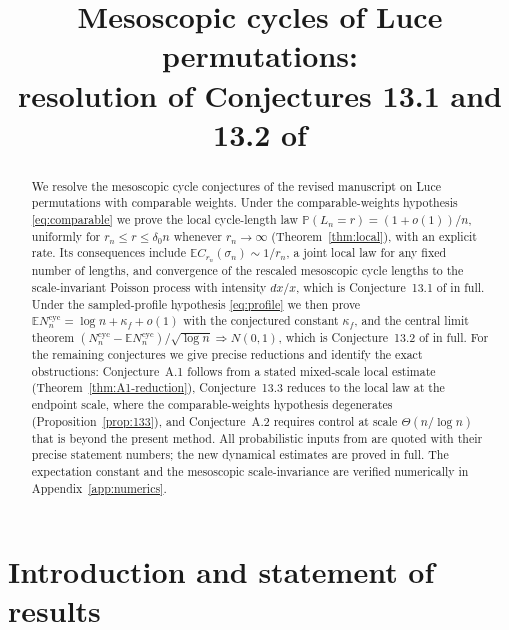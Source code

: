 \documentclass[11pt]{article}
\title{Mesoscopic cycles of Luce permutations:\\
resolution of Conjectures 13.1 and 13.2 of \cite{Lon26}}
\author{}
\date{}
\newcommand{\E}{\mathbb{E}}
\newcommand{\Prob}{\mathbb{P}}
\newcommand{\1}{\mathbf{1}}
\newcommand{\cyc}{\mathrm{cyc}}
\theoremstyle{remark}
\begin{document}
\maketitle

\begin{abstract}
We resolve the mesoscopic cycle conjectures of the revised manuscript
\cite{Lon26} on Luce permutations with comparable weights. Under the
comparable-weights hypothesis \eqref{eq:comparable} we prove the local
cycle-length law $\Prob(L_n=r)=(1+o(1))/n$, uniformly for
$r_n\le r\le\delta_0 n$ whenever $r_n\to\infty$ (Theorem~\ref{thm:local}),
with an explicit rate. Its consequences include
$\E C_{r_n}(\sigma_n)\sim 1/r_n$, a joint local law for any fixed
number of lengths, and convergence of the rescaled mesoscopic cycle
lengths to the scale-invariant Poisson process with intensity $dx/x$,
which is Conjecture~13.1 of \cite{Lon26} in full. Under the
sampled-profile hypothesis \eqref{eq:profile} we then prove
$\E N_n^{\cyc}=\log n+\kappa_f+o(1)$ with the conjectured constant
$\kappa_f$, and the central limit theorem
$(N_n^{\cyc}-\E N_n^{\cyc})/\sqrt{\log n}\Rightarrow N(0,1)$, which is
Conjecture~13.2 of \cite{Lon26} in full. For the remaining
conjectures we give precise reductions and identify the exact
obstructions: Conjecture~A.1 follows from a stated mixed-scale local
estimate (Theorem~\ref{thm:A1-reduction}), Conjecture~13.3 reduces to
the local law at the endpoint scale, where the comparable-weights
hypothesis degenerates (Proposition~\ref{prop:133}), and
Conjecture~A.2 requires control at scale $\Theta(n/\log n)$ that is
beyond the present method. All probabilistic inputs from \cite{Lon26}
are quoted with their precise statement numbers; the new dynamical
estimates are proved in full. The expectation constant and the
mesoscopic scale-invariance are verified numerically in
Appendix~\ref{app:numerics}.
\end{abstract}

\section{Introduction and statement of results}\label{sec:intro}
\end{document}
